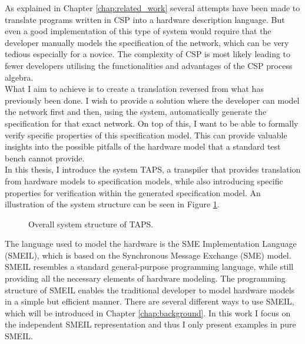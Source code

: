 As explained in Chapter \ref{chap:related_work} several attempts have been made to translate programs written in CSP into a hardware description language. But even a good implementation of this type of system would require that the developer manually models the specification of the \cspm{} network, which can be very tedious especially for a novice.
The complexity of CSP is most likely leading to fewer developers utilising the functionalities and advantages of the CSP process algebra.\\

What I aim to achieve is to create a translation reversed from what has previously been done. I wish to provide a solution where the developer can model the network first and then, using the system, automatically generate the specification for that exact network. On top of this, I want to be able to formally verify specific properties of this specification model. This can provide valuable insights into the possible pitfalls of the hardware model that a standard test bench cannot provide.\\

In this thesis, I introduce the system TAPS, a transpiler that provides translation from hardware models to specification models, while also introducing specific properties for verification within the generated specification model. An illustration of the system structure can be seen in Figure \ref{fig:simple_TAPS_network}.\\

\begin{figure}[!ht]
  \centering
  \caption{Overall system structure of TAPS.}
  \label{fig:simple_TAPS_network}
\end{figure}
The language used to model the hardware is the SME Implementation Language (SMEIL), which is based on the Synchronous Message Exchange (SME) model. SMEIL resembles a standard general-purpose programming language, while still providing all the necessary elements of hardware modeling. The programming structure of SMEIL enables the traditional developer to model hardware models in a simple but efficient manner. There are several different ways to use SMEIL, which will be introduced in Chapter \ref{chap:background}. In this work I focus on the independent SMEIL representation and thus I only present examples in pure SMEIL. \\\\


